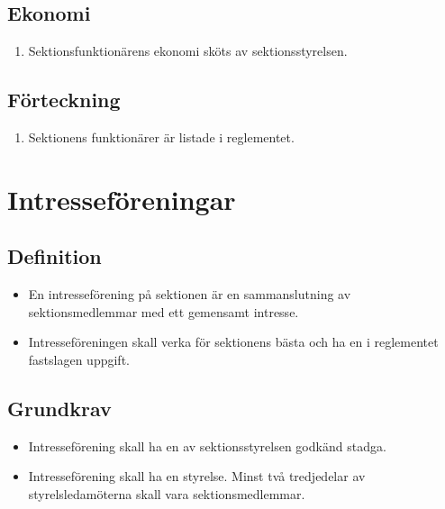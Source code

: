 \documentclass[11pt,a4paper]{article}
\begin{document}
\subsection{Ekonomi}

\begin{enumerate}[\thesubsection .1]

  \item Sektionsfunktionärens ekonomi sköts av sektionsstyrelsen.

\end{enumerate}

\subsection{Förteckning}

\begin{enumerate}[\thesubsection .1]


\item Sektionens funktionärer är listade i reglementet.
\end{enumerate}

\newpage



\section{Intresseföreningar}


\subsection{Definition}

\begin{itemize}

  \item En intresseförening på sektionen är en samman\-slutning av sektions\-medlemmar med ett gemensamt intresse.

  \item Intresseföreningen skall verka för sektionens bästa och ha en
  i reglementet fastslagen uppgift.

\end{itemize}

\subsection{Grundkrav}

\begin{itemize}

  \item Intresseförening skall ha en av sektionsstyrelsen godkänd stadga.
  
    \item Intresseförening skall ha en styrelse. Minst två tredjedelar av styrelsledamöterna skall vara sektionsmedlemmar.

\end{itemize}
\end{document}
